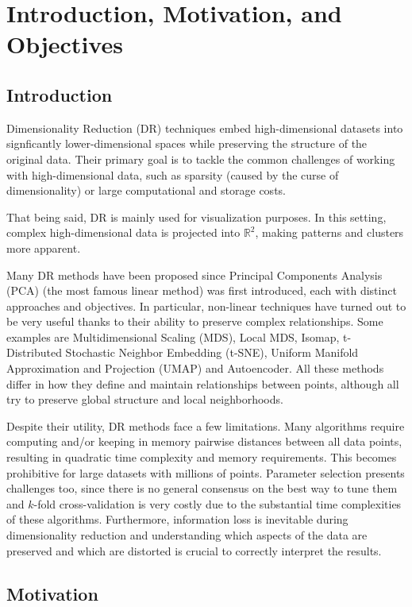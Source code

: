 \section{Introduction, Motivation, and Objectives}

\subsection{Introduction}

Dimensionality Reduction (DR) techniques embed high-dimensional datasets into signficantly lower-dimensional spaces while preserving the structure of the original data. Their primary goal is to tackle the common challenges of working with high-dimensional data, such as sparsity (caused by the curse of dimensionality) or large computational and storage costs.

That being said, DR is mainly used for visualization purposes. In this setting, complex high-dimensional data is projected into $\mathbb{R}^2$, making patterns and clusters more apparent.

Many DR methods have been proposed since Principal Components Analysis (PCA) (the most famous linear method) was first introduced, each with distinct approaches and objectives. In particular, non-linear techniques have turned out to be very useful thanks to their ability to preserve complex relationships. Some examples are Multidimensional Scaling (MDS), Local MDS, Isomap, t-Distributed Stochastic Neighbor Embedding (t-SNE), Uniform Manifold Approximation and Projection (UMAP) and Autoencoder. All these methods differ in how they define and maintain relationships between points, although all try to preserve global structure and local neighborhoods.

Despite their utility, DR methods face a few limitations. Many algorithms require computing and/or keeping in memory pairwise distances between all data points, resulting in quadratic time complexity and memory requirements. This becomes prohibitive for large datasets with millions of points. Parameter selection presents challenges too, since there is no general consensus on the best way to tune them and $k$-fold cross-validation is very costly due to the substantial time complexities of these algorithms. Furthermore, information loss is inevitable during dimensionality reduction and understanding which aspects of the data are preserved and which are distorted is crucial to correctly interpret the results.

\subsection{Motivation}

